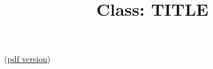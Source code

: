 \documentclass{article}
\begin{document}
\title{Class: TITLE}

(\href{class_TITLE.pdf}{pdf version})
\end{document}
